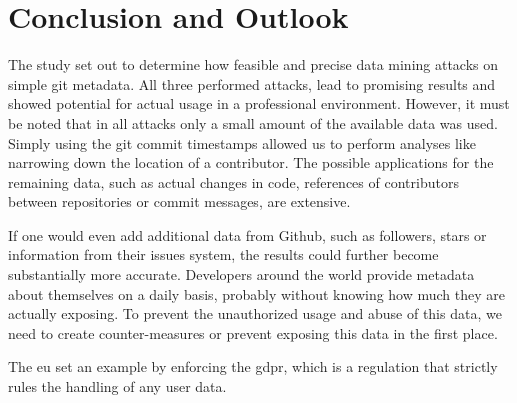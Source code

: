 \chapter{Conclusion and Outlook}

The study set out to determine how feasible and precise data mining attacks on simple git metadata.
All three performed attacks, lead to promising results and showed potential for actual usage in a professional environment.
However, it must be noted that in all attacks only a small amount of the available data was used.
Simply using the git commit timestamps allowed us to perform analyses like narrowing down the location of a contributor.
The possible applications for the remaining data, such as actual changes in code, references of contributors between repositories or commit messages, are extensive.

If one would even add additional data from Github, such as followers, stars or information from their issues system, the results could further become substantially more accurate.
Developers around the world provide metadata about themselves on a daily basis, probably without knowing how much they are actually exposing.
To prevent the unauthorized usage and abuse of this data, we need to create counter-measures or prevent exposing this data in the first place.

The \ac{eu} set an example by enforcing the \ac{gdpr}, which is a regulation that strictly rules the handling of any user data.
